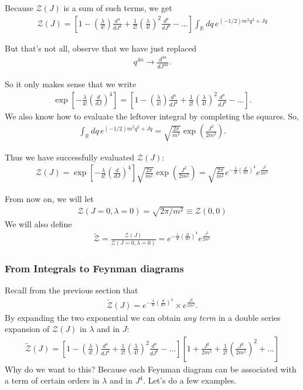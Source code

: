 \documentclass{book}
\theoremstyle{definition}
\newcommand{\f}[2]{\frac{#1}{#2}}
\newcommand{\lp}{\left(}
\newcommand{\rp}{\right)}
\newcommand{\lb}{\left[}
\newcommand{\rb}{\right]}
\newcommand{\Z}{\mathcal{Z}}
\begin{document}
Because $\Z(J)$ is a sum of such terms, we get
\begin{align}
\boxed{\Z(J) = \lb 1 - \lp\f{\lambda}{4!}\rp \f{d^4}{dJ^4} + \f{1}{2!}\lp\f{\lambda}{4!}\rp^2 \f{d^8}{dJ^8} - \dots \rb\int_\mathbb{R}dq \, e^{(-1/2)m^2 q^2 + Jq}}
\end{align}

But that's not all, observe that we have just replaced 
\begin{align}
q^{4n} \to \f{d^{4n}}{dJ^{4n}}.
\end{align}

So it only makes sense that we write 
\begin{align}
\exp\lb -\f{\lambda}{4!}\lp \f{d}{dJ} \rp^4 \rb = \lb 1 - \lp\f{\lambda}{4!}\rp \f{d^4}{dJ^4} + \f{1}{2!}\lp\f{\lambda}{4!}\rp^2 \f{d^8}{dJ^8} - \dots \rb.
\end{align}
We also know how to evaluate the leftover integral by completing the squares. So, 
\begin{align}
\int_\mathbb{R}dq \, e^{(-1/2)m^2 q^2 + Jq} = \sqrt{\f{2\pi}{m^2}}\exp\lp \f{J^2}{2m^2} \rp.
\end{align}

Thus we have successfully evaluated $\Z(J)$:
\begin{align}
\boxed{\Z(J) = \exp\lb -\f{\lambda}{4!}\lp \f{d}{dJ} \rp^4 \rb \sqrt{\f{2\pi}{m^2}}\exp\lp \f{J^2}{2m^2} \rp = \sqrt{\f{2\pi}{m^2}} e^{-\f{\lambda}{4!}\lp \f{d}{dJ} \rp^4} e^\f{J^2}{2m^2}}
\end{align}

From now on, we will let 
\begin{align}
\Z(J=0, \lambda =0) = \sqrt{2\pi / m^2} \equiv \Z(0,0)
\end{align}
We will also define
\begin{align}
\boxed{\tilde{\Z} = \f{\Z(J)}{\Z(J = 0, \lambda = 0) } = e^{-\f{\lambda}{4!}\lp \f{d}{dJ} \rp^4} e^\f{J^2}{2m^2}}
\end{align}



\subsubsection{From Integrals to Feynman diagrams}


Recall from the previous section that
\begin{align}
\tilde{\Z}(J) =  e^{-\f{\lambda}{4!}\lp \f{d}{dJ} \rp^4} \times e^\f{J^2}{2m^2}.
\end{align}
By expanding the two exponential we can obtain \textit{any term} in a double series expansion of $\Z(J)$ in $\lambda$ and in $J$:
\begin{align}
\tilde{\Z}(J) = \lb 1 - \lp\f{\lambda}{4!}\rp \f{d^4}{dJ^4} + \f{1}{2!}\lp\f{\lambda}{4!}\rp^2 \f{d^8}{dJ^8} - \dots \rb \lb 1 + \f{J^2}{2m^2} + \f{1}{2!}\lp \f{J^2}{2m^2} \rp^2 + \dots \rb
\end{align}
Why do we want to this? Because each Feynman diagram can be associated with a term of certain orders in $\lambda$ and in $J^4$. Let's do a few examples.\\
\end{document}
